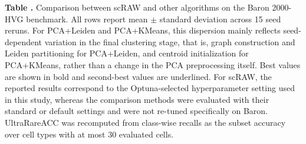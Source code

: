 \documentclass[11pt,a4paper]{article}
\begin{document}
\vspace{\baselineskip}
\noindent\textbf{Table \thetable.}
Comparison between scRAW and other algorithms on the Baron 2000-HVG benchmark. All rows report mean $\pm$ standard deviation across 15 seed reruns. For PCA+Leiden and PCA+KMeans, this dispersion mainly reflects seed-dependent variation in the final clustering stage, that is, graph construction and Leiden partitioning for PCA+Leiden, and centroid initialization for PCA+KMeans, rather than a change in the PCA preprocessing itself. Best values are shown in bold and second-best values are underlined. For scRAW, the reported results correspond to the Optuna-selected hyperparameter setting used in this study, whereas the comparison methods were evaluated with their standard or default settings and were not re-tuned specifically on Baron. UltraRareACC was recomputed from class-wise recalls as the subset accuracy over cell types with at most 30 evaluated cells.
\label{tab:benchmark_compare}
\end{document}
